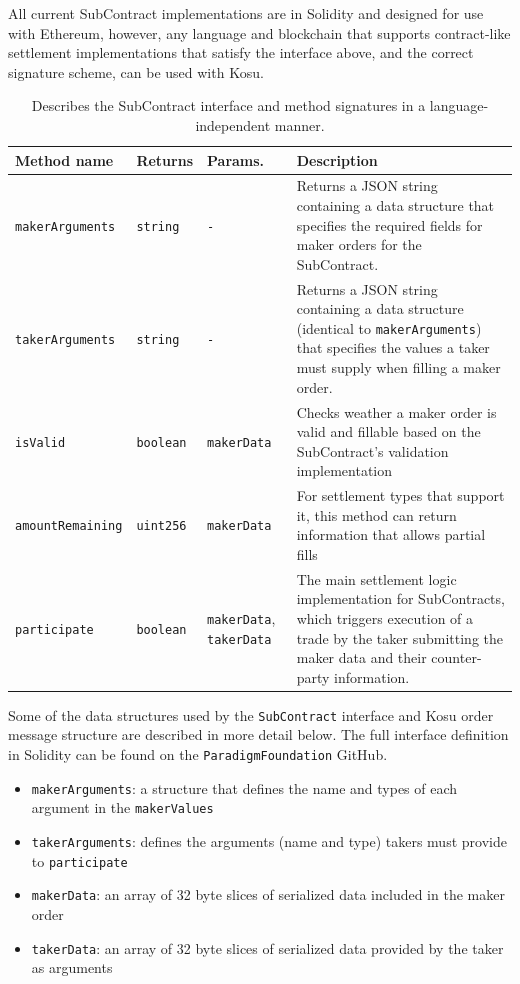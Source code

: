 \documentclass[10pt]{article}
\begin{document}
All current SubContract implementations are in Solidity and designed for use with Ethereum, however, any language and blockchain that supports contract-like settlement implementations that satisfy the interface above, and the correct signature scheme, can be used with Kosu.
\medskip

\bgroup
\def\arraystretch{1.2}
\begin{table}[H]
\centering
\label{table:table1}
\begin{tabularx}{1\textwidth}{|l|l|X|p{8cm}|}
\hline
\textbf{Method name} & \textbf{Returns} & \textbf{Params.} & \textbf{Description} \\ 
\hline
\texttt{makerArguments} & \texttt{string} & \texttt{-} & Returns a JSON string containing a data structure that specifies the required fields for maker orders for the SubContract. \\
\hline
\texttt{takerArguments} & \texttt{string} & \texttt{-} & Returns a JSON string containing a data structure (identical to \texttt{makerArguments}) that specifies the values a taker must supply when filling a maker order. \\
\hline
\texttt{isValid} & \texttt{boolean} & \texttt{makerData} & Checks weather a maker order is valid and fillable based on the SubContract's validation implementation \\
\hline
\texttt{amountRemaining} & \texttt{uint256} & \texttt{makerData} & For settlement types that support it, this method can return information that allows partial fills \\
\hline
\texttt{participate} & \texttt{boolean} & \texttt{makerData}, \texttt{takerData} & The main settlement logic implementation for SubContracts, which triggers execution of a trade by the taker submitting the maker data and their counter-party information. \\
\hline
\end{tabularx}
\caption{Describes the SubContract interface and method signatures in a language-independent manner.} 
\end{table}
\egroup

Some of the data structures used by the \texttt{SubContract} interface and Kosu order message structure are described in more detail below. The full interface definition in Solidity can be found on the \texttt{ParadigmFoundation} GitHub\cite{kosu-sdk}.

\begin{itemize}
  \item \texttt{makerArguments}: a structure that defines the name and types of each argument in the \texttt{makerValues}
  \item \texttt{takerArguments}: defines the arguments (name and type) takers must provide to \texttt{participate} 
  \item \texttt{makerData}: an array of 32 byte slices of serialized data included in the maker order
  \item \texttt{takerData}: an array of 32 byte slices of serialized data provided by the taker as arguments
\end{itemize}
\end{document}
